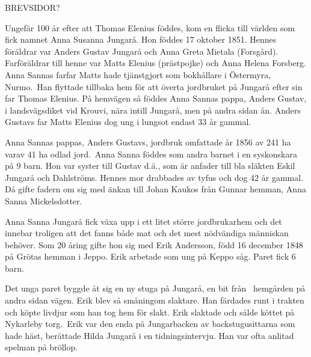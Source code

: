 BREVSIDOR?



Ungefär 100 år efter att Thomas Elenius föddes, kom en flicka till världen som fick namnet Anna Susanna Jungarå. Hon föddes 17 oktober 1851. Hennes föräldrar var Anders Gustav Jungarå och Anna Greta Mietala (Forsgård). Farföräldrar till henne var Matts Elenius (prästpojke) och Anna Helena Forsberg. Anna Sannas farfar Matts hade tjänstgjort som bokhållare i Östermyra, Nurmo. Han flyttade tillbaka hem för att överta jordbruket på Jungarå efter sin far Thomas Elenius. På hemvägen så föddes Anna Sannas pappa, Anders Gustav, i landsvägsdiket vid Krouvi, nära intill Jungarå, men på andra sidan ån. Anders Gustavs far Matts Elenius dog ung i lungsot endast 33 år gammal.

Anna Sannas pappas, Anders Gustavs, jordbruk omfattade år 1856 av 241 ha varav 41 ha odlad jord. Anna Sanna föddes som andra barnet i en syskonskara på 9 barn. Hon var syster till Gustav d.ä., som är anfader till bla släkten Eskil Jungarå och Dahlströms. Hennes mor drabbades av tyfus och dog 42 år gammal. Då gifte fadern om sig med änkan till Johan Kaukos från Gunnar hemman, Anna Sanna Mickelsdotter.

Anna Sanna Jungarå fick växa upp i ett litet större jordbrukarhem och det innebar troligen att det fanns både mat och det mest nödvändiga människan behöver. Som 20 åring gifte hon sig med Erik Andersson, född 16 december 1848 på Grötas hemman i Jeppo. Erik arbetade som ung på Keppo såg. Paret fick 6 barn.
\begin{jhchildren}
  \item {}
  \item {}
  \item {}
  \item {}
  \item {}
  \item {}
\end{jhchildren}
Det unga paret byggde åt sig en ny stuga på Jungarå, en bit från  hemgården på andra sidan vägen. Erik blev så småningom slaktare. Han färdades runt i trakten och köpte livdjur som han tog hem för slakt. Erik slaktade och sålde köttet på Nykarleby torg. Erik var den enda på Jungarbacken av backstugusittarna som hade häst, berättade Hilda Jungarå i en tidningsintervju. Han var ofta anlitad spelman på bröllop.

